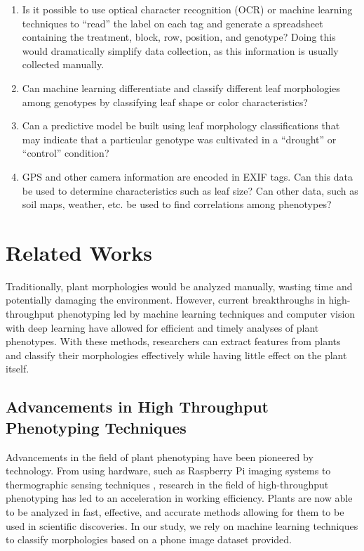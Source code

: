 \documentclass[final,5p,times,twocolumn,authoryear]{elsarticle}
\begin{document}
\begin{enumerate}

\item Is it possible to use optical character recognition (OCR) or machine learning techniques to “read” the label on each tag and generate a spreadsheet containing the treatment, block, row, position, and genotype? Doing this would dramatically simplify data collection, as this information is usually collected manually.

\item Can machine learning differentiate and classify different leaf morphologies among genotypes by classifying leaf shape or color characteristics?

\item Can a predictive model be built using leaf morphology classifications that may indicate that a particular genotype was cultivated in a “drought” or “control” condition?

\item GPS and other camera information are encoded in EXIF tags. Can this data be used to determine characteristics such as leaf size? Can other data, such as soil maps, weather, etc. be used to find correlations among phenotypes?

\end{enumerate}

\section{Related Works}
\label{related_works}

Traditionally, plant morphologies would be analyzed manually, wasting time and potentially damaging the environment. However, current breakthroughs in high-throughput phenotyping led by machine learning techniques\citep{koh2021automated, pound2017deep} and computer vision with deep learning \citep{mochida2019computer} have allowed for efficient and timely analyses of plant phenotypes. With these methods, researchers can extract features from plants and classify their morphologies effectively while having little effect on the plant itself.

\subsection{Advancements in High Throughput Phenotyping Techniques}
\label{related_works_1}

Advancements in the field of plant phenotyping have been pioneered by technology. From using hardware, such as Raspberry Pi imaging systems \citep{tausen2020greenotyper} to thermographic sensing techniques \citep{walter2015plant}, research in the field of high-throughput phenotyping has led to an acceleration in working efficiency. Plants are now able to be analyzed in fast, effective, and accurate methods allowing for them to be used in scientific discoveries. In our study, we rely on machine learning techniques to classify morphologies based on a phone image dataset provided.
\end{document}
